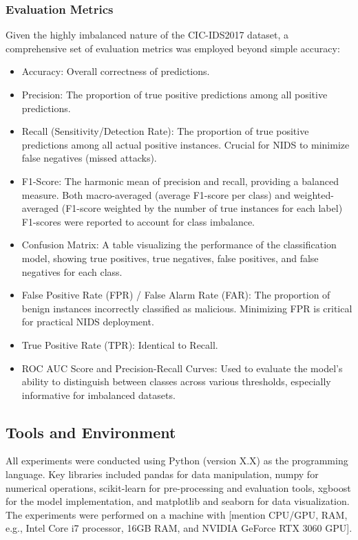 \subsubsection{Evaluation Metrics}
Given the highly imbalanced nature of the CIC-IDS2017 dataset, a comprehensive set of evaluation metrics was employed beyond simple accuracy:
\begin{itemize}
	\item Accuracy: Overall correctness of predictions.
	\item Precision: The proportion of true positive predictions among all positive predictions.
	\item  Recall (Sensitivity/Detection Rate): The proportion of true positive predictions among all actual positive instances. Crucial for NIDS to minimize false negatives (missed attacks).
	\item F1-Score: The harmonic mean of precision and recall, providing a balanced measure. Both macro-averaged (average F1-score per class) and weighted-averaged (F1-score weighted by the number of true instances for each label) F1-scores were reported to account for class imbalance.
	\item Confusion Matrix: A table visualizing the performance of the classification model, showing true positives, true negatives, false positives, and false negatives for each class.
	\item False Positive Rate (FPR) / False Alarm Rate (FAR): The proportion of benign instances incorrectly classified as malicious. Minimizing FPR is critical for practical NIDS deployment.
	\item True Positive Rate (TPR): Identical to Recall.
	\item ROC AUC Score and Precision-Recall Curves: Used to evaluate the model's ability to distinguish between classes across various thresholds, especially informative for imbalanced datasets.
\end{itemize}

\subsection{Tools and Environment}
All experiments were conducted using Python (version X.X) as the programming language. Key libraries included pandas for data manipulation, numpy for numerical operations, scikit-learn for pre-processing and evaluation tools, xgboost for the model implementation, and matplotlib and seaborn for data visualization. The experiments were performed on a machine with [mention CPU/GPU, RAM, e.g., Intel Core i7 processor, 16GB RAM, and NVIDIA GeForce RTX 3060 GPU].

